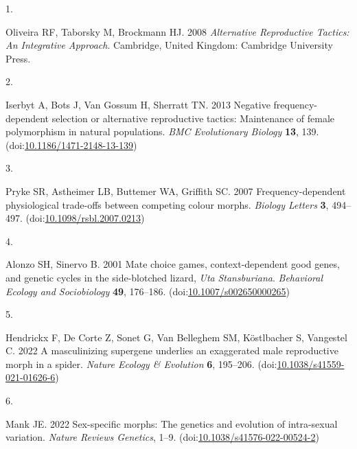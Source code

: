 \documentclass[
  11pt,
  a4paper,
]{article}
\newlength{\cslhangindent}
\newlength{\csllabelwidth}
\newlength{\cslentryspacingunit} %
\newenvironment{CSLReferences}[2] %
 {%
  \setlength{\parindent}{0pt}
  \ifodd #1
  \let\oldpar\par
  \def\par{\hangindent=\cslhangindent\oldpar}
  \fi
  \setlength{\parskip}{#2\cslentryspacingunit}
 }%
 {}
\newcommand{\CSLLeftMargin}[1]{\parbox[t]{\csllabelwidth}{#1}}
\newcommand{\CSLRightInline}[1]{\parbox[t]{\linewidth - \csllabelwidth}{#1}\break}
\begin{document}
\hypertarget{refs}{}
\begin{CSLReferences}{0}{0}
\leavevmode{}%
\CSLLeftMargin{1. }%
\CSLRightInline{Oliveira RF, Taborsky M, Brockmann HJ. 2008 \emph{Alternative {Reproductive Tactics}: {An Integrative Approach}}. {Cambridge, United Kingdom}: {Cambridge University Press}. }

\leavevmode{}%
\CSLLeftMargin{2. }%
\CSLRightInline{Iserbyt A, Bots J, Van Gossum H, Sherratt TN. 2013 Negative frequency-dependent selection or alternative reproductive tactics: Maintenance of female polymorphism in natural populations. \emph{BMC Evolutionary Biology} \textbf{13}, 139. (doi:\href{https://doi.org/10.1186/1471-2148-13-139}{10.1186/1471-2148-13-139})}

\leavevmode{}%
\CSLLeftMargin{3. }%
\CSLRightInline{Pryke SR, Astheimer LB, Buttemer WA, Griffith SC. 2007 Frequency-dependent physiological trade-offs between competing colour morphs. \emph{Biology Letters} \textbf{3}, 494--497. (doi:\href{https://doi.org/10.1098/rsbl.2007.0213}{10.1098/rsbl.2007.0213})}

\leavevmode{}%
\CSLLeftMargin{4. }%
\CSLRightInline{Alonzo SH, Sinervo B. 2001 Mate choice games, context-dependent good genes, and genetic cycles in the side-blotched lizard, {\emph{Uta}}{ \emph{Stansburiana}}. \emph{Behavioral Ecology and Sociobiology} \textbf{49}, 176--186. (doi:\href{https://doi.org/10.1007/s002650000265}{10.1007/s002650000265})}

\leavevmode{}%
\CSLLeftMargin{5. }%
\CSLRightInline{Hendrickx F, De Corte Z, Sonet G, Van Belleghem SM, Köstlbacher S, Vangestel C. 2022 A masculinizing supergene underlies an exaggerated male reproductive morph in a spider. \emph{Nature Ecology \& Evolution} \textbf{6}, 195--206. (doi:\href{https://doi.org/10.1038/s41559-021-01626-6}{10.1038/s41559-021-01626-6})}

\leavevmode{}%
\CSLLeftMargin{6. }%
\CSLRightInline{Mank JE. 2022 Sex-specific morphs: The genetics and evolution of intra-sexual variation. \emph{Nature Reviews Genetics}, 1--9. (doi:\href{https://doi.org/10.1038/s41576-022-00524-2}{10.1038/s41576-022-00524-2})}


\end{CSLReferences}
\end{document}
